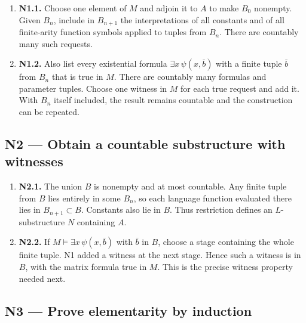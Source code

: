 \documentclass[preprint,12pt,aps,pra,showkeys,amsmath,amssymb,superscriptaddress,floatfix]{revtex4-2}
\theoremstyle{definition}
\theoremstyle{remark}
\begin{document}
\begin{enumerate}
\def\labelenumi{\arabic{enumi}.}
\item
  \textbf{N1.1.} Choose one element of \(M\) and adjoin it to \(A\) to
  make \(B_0\) nonempty. Given \(B_n\), include in \(B_{n+1}\) the
  interpretations of all constants and of all finite-arity function
  symbols applied to tuples from \(B_n\). There are countably many such
  requests.
\item
  \textbf{N1.2.} Also list every existential formula
  \(\exists x\,\psi(x,\bar b)\) with a finite tuple \(\bar b\) from
  \(B_n\) that is true in \(M\). There are countably many formulas and
  parameter tuples. Choose one witness in \(M\) for each true request
  and add it. With \(B_n\) itself included, the result remains countable
  and the construction can be repeated.
\end{enumerate}

\subsection{N2 --- Obtain a countable substructure with
witnesses}\label{n2-obtain-a-countable-substructure-with-witnesses}

\begin{enumerate}
\def\labelenumi{\arabic{enumi}.}
\item
  \textbf{N2.1.} The union \(B\) is nonempty and at most countable. Any
  finite tuple from \(B\) lies entirely in some \(B_n\), so each
  language function evaluated there lies in \(B_{n+1}\subset B\).
  Constants also lie in \(B\). Thus restriction defines an
  \(L\)-substructure \(N\) containing \(A\).
\item
  \textbf{N2.2.} If \(M\models\exists x\,\psi(x,\bar b)\) with
  \(\bar b\) in \(B\), choose a stage containing the whole finite tuple.
  N1 added a witness at the next stage. Hence such a witness is in
  \(B\), with the matrix formula true in \(M\). This is the precise
  witness property needed next.
\end{enumerate}

\subsection{N3 --- Prove elementarity by
induction}\label{n3-prove-elementarity-by-induction}
\end{document}
